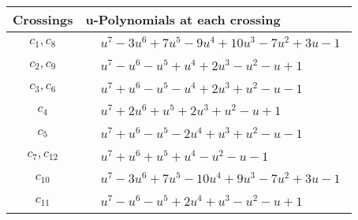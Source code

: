 \documentclass[1p]{elsarticle_modified}
\theoremstyle{definition}
\begin{document}
\begin{tabular}{m{50pt}|m{274pt}}
Crossings & \hspace{64pt}u-Polynomials at each crossing \\
\hline $$\begin{aligned}c_{1},c_{8}\end{aligned}$$&$\begin{aligned}
&u^7-3 u^6+7 u^5-9 u^4+10 u^3-7 u^2+3 u-1
\end{aligned}$\\
\hline $$\begin{aligned}c_{2},c_{9}\end{aligned}$$&$\begin{aligned}
&u^7- u^6- u^5+u^4+2 u^3- u^2- u+1
\end{aligned}$\\
\hline $$\begin{aligned}c_{3},c_{6}\end{aligned}$$&$\begin{aligned}
&u^7+u^6- u^5- u^4+2 u^3+u^2- u-1
\end{aligned}$\\
\hline $$\begin{aligned}c_{4}\end{aligned}$$&$\begin{aligned}
&u^7+2 u^6+u^5+2 u^3+u^2- u+1
\end{aligned}$\\
\hline $$\begin{aligned}c_{5}\end{aligned}$$&$\begin{aligned}
&u^7+u^6- u^5-2 u^4+u^3+u^2- u-1
\end{aligned}$\\
\hline $$\begin{aligned}c_{7},c_{12}\end{aligned}$$&$\begin{aligned}
&u^7+u^6+u^5+u^4- u^2- u-1
\end{aligned}$\\
\hline $$\begin{aligned}c_{10}\end{aligned}$$&$\begin{aligned}
&u^7-3 u^6+7 u^5-10 u^4+9 u^3-7 u^2+3 u-1
\end{aligned}$\\
\hline $$\begin{aligned}c_{11}\end{aligned}$$&$\begin{aligned}
&u^7- u^6- u^5+2 u^4+u^3- u^2- u+1
\end{aligned}$\\
\hline
\end{tabular}\\~\\
\end{document}
